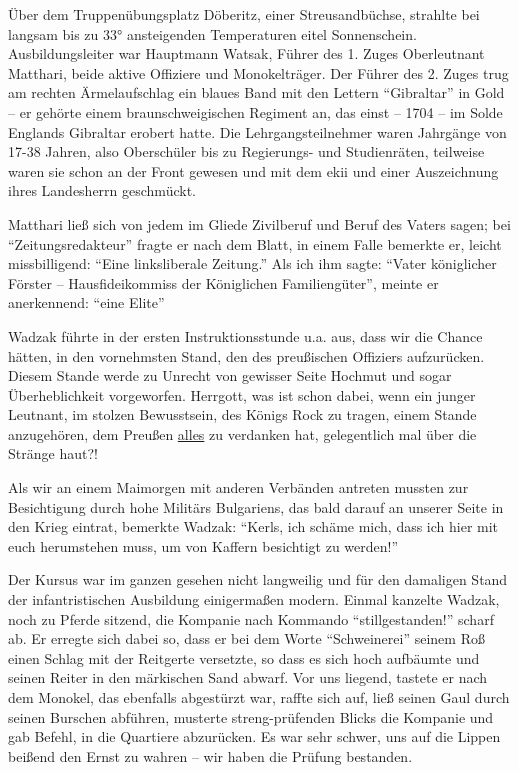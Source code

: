 Über dem Truppenübungsplatz Döberitz, einer Streusandbüchse, strahlte bei langsam bis zu 33° ansteigenden Temperaturen eitel Sonnenschein. Ausbildungsleiter war Hauptmann Watsak, Führer des 1. Zuges Oberleutnant Matthari, beide aktive Offiziere und Monokelträger. Der Führer des 2. Zuges trug am rechten Ärmelaufschlag ein blaues Band mit den Lettern \enquote{Gibraltar} in Gold -- er gehörte einem braunschweigischen Regiment an, das einst -- 1704 -- im Solde Englands Gibraltar erobert hatte. Die Lehrgangsteilnehmer waren Jahrgänge von 17-38 Jahren, also Oberschüler bis zu Regierungs- und Studienräten, teilweise waren sie schon an der Front gewesen und mit dem \ac{ekii} und einer Auszeichnung ihres Landesherrn geschmückt.

Matthari ließ sich von jedem im Gliede Zivilberuf und Beruf des Vaters sagen; bei \enquote{Zeitungsredakteur} fragte er nach dem Blatt, in einem Falle bemerkte er, leicht missbilligend: \enquote{Eine linksliberale Zeitung.} Als ich ihm sagte: \enquote{Vater königlicher Förster -- Hausfideikommiss der Königlichen Familiengüter}, meinte er anerkennend: \enquote{eine Elite}

Wadzak führte in der ersten Instruktionsstunde u.a. aus, dass wir die Chance hätten, in den vornehmsten Stand, den des preußischen Offiziers aufzurücken. Diesem Stande werde zu Unrecht von gewisser Seite Hochmut und sogar Überheblichkeit vorgeworfen. Herrgott, was ist schon dabei, wenn ein junger Leutnant, im stolzen Bewusstsein, des Königs Rock zu tragen, einem Stande anzugehören, dem Preußen \underline{alles} zu verdanken hat, gelegentlich mal über die Stränge haut?!

Als wir an einem Maimorgen mit anderen Verbänden antreten mussten zur Besichtigung durch hohe Militärs Bulgariens, das bald darauf an unserer Seite in den Krieg eintrat, bemerkte Wadzak: \enquote{Kerls, ich schäme mich, dass ich hier mit euch herumstehen muss, um von Kaffern besichtigt zu werden!}

Der Kursus war im ganzen gesehen nicht langweilig und für den damaligen Stand der infantristischen Ausbildung einigermaßen modern. Einmal kanzelte Wadzak, noch zu Pferde sitzend, die Kompanie nach Kommando \enquote{stillgestanden!} scharf ab. Er erregte sich dabei so, dass er bei dem Worte \enquote{Schweinerei} seinem Roß einen Schlag mit der Reitgerte versetzte, so dass es sich hoch aufbäumte und seinen Reiter in den märkischen Sand abwarf. Vor uns liegend, tastete er nach dem Monokel, das ebenfalls abgestürzt war, raffte sich auf, ließ seinen Gaul durch seinen Burschen abführen, musterte streng-prüfenden Blicks die Kompanie und gab Befehl, in die Quartiere abzurücken. Es war sehr schwer, uns auf die Lippen beißend den Ernst zu wahren -- wir haben die Prüfung bestanden.

